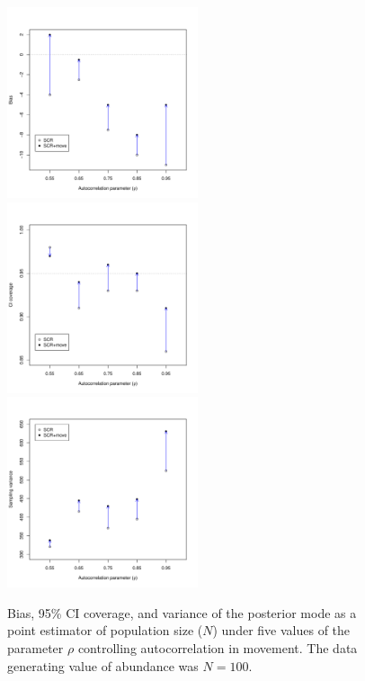 \documentclass[12pt]{article}
\begin{document}
\begin{figure}[h!]
  \centering
  \includegraphics[width=0.5\textwidth, trim=0mm 15mm 0mm 15mm, clip]{../R/sims/bias-N.pdf} \\
  \includegraphics[width=0.5\textwidth, trim=0mm 15mm 0mm 15mm, clip]{../R/sims/cover-N.pdf} \\
  \includegraphics[width=0.5\textwidth, trim=0mm 0mm 0mm 15mm, clip]{../R/sims/var-N.pdf}
  \caption{Bias, 95\% CI coverage, and variance of the posterior mode
    as a point estimator of population size ($N$) under five values of
    the parameter $\rho$ controlling autocorrelation in movement. The
    data generating value of abundance was $N=100$. } 
  \label{fig:bias}
\end{figure}
\end{document}

